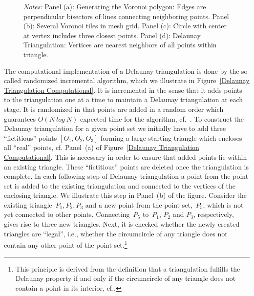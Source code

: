 \documentclass[a4paper,12pt]{article}
\begin{document}
\begin{figure}[htb]
\begin{tabular}{cC{1cm}c}
	\end{tabular}
	\caption*{\footnotesize{\emph{Notes:} Panel (a): Generating the Voronoi polygon: Edges are perpendicular bisectors of lines connecting neighboring points. Panel (b): Several Voronoi tiles in mesh grid. Panel (c): Circle with center at vertex includes three closest points. Panel (d): Delaunay Triangulation: Vertices are nearest neighbors of all points within triangle.}}
\end{figure}

The computational implementation of a Delaunay triangulation is done by the so-called randomized incremental algorithm, which we illustrate in Figure~\ref{Delaunay Triangulation Computational}. It is incremental in the sense that it adds points to the triangulation one at a time to maintain a Delaunay triangulation at each stage. It is randomized in that points are added in a random order which guarantees $O(N~log~N)$ expected time for the algorithm, cf.~. To construct the Delaunay triangulation for a given point set we initially have to add three ``fictitious'' points $\left[\Theta_{1},\Theta_{2},\Theta_{3}\right]$ forming a large starting triangle which encloses all ``real'' points, cf. Panel~(a) of Figure~\ref{Delaunay Triangulation Computational}. This is necessary in order to ensure that added points lie within an existing triangle. These ``fictitious'' points are deleted once the triangulation is complete. In each following step of Delaunay triangulation a point from the point set is added to the existing triangulation and connected to the vertices of the enclosing triangle. We illustrate this step in Panel~(b) of the figure. Consider the existing triangle~$P_{1},P_{2},P_{3}$ and a new point from the point set,~$P_{5}$, which is not yet connected to other points. Connecting~$P_{5}$ to~$P_{1}$, $P_{2}$ and $P_{3}$, respectively, gives rise to three new triangles. Next, it is checked whether the newly created triangles are ``legal'', i.e., whether the circumcircle of any triangle does not contain any other point of the point set.\footnote{This principle is derived from the definition that a triangulation fulfills the Delaunay property if and only if the circumcircle of any triangle does not contain a point in its interior, cf..}
\end{document}
